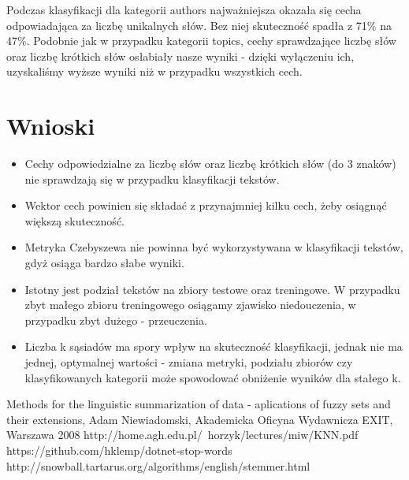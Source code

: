 \documentclass{classrep}
\begin{document}
Podczas klasyfikacji dla kategorii authors najważniejsza okazała się cecha odpowiadająca za liczbę unikalnych słów. Bez niej skuteczność spadła z 71\% na 47\%. Podobnie jak w przypadku kategorii topics, cechy sprawdzające liczbę słów oraz liczbę krótkich słów osłabiały nasze wyniki - dzięki wyłączeniu ich, uzyskaliśmy wyższe wyniki niż w przypadku wszystkich cech. 

	
\section{Wnioski}
\begin{itemize}
	\item Cechy odpowiedzialne za liczbę słów oraz liczbę krótkich słów (do 3 znaków)  nie sprawdzają się w przypadku klasyfikacji tekstów.
	\item Wektor cech powinien się składać z przynajmniej kilku cech, żeby osiągnąć większą skuteczność.
	\item Metryka Czebyszewa nie powinna być wykorzystywana w klasyfikacji tekstów, gdyż osiąga bardzo słabe wyniki.
	\item Istotny jest podział tekstów na zbiory testowe oraz treningowe. W przypadku zbyt małego zbioru treningowego osiągamy zjawisko niedouczenia, w przypadku zbyt dużego - przeuczenia.
	\item Liczba k sąsiadów ma spory wpływ na skuteczność klasyfikacji, jednak nie ma jednej, optymalnej wartości - zmiana metryki, podziału zbiorów czy klasyfikowanych kategorii może spowodować obniżenie wyników dla stałego k.
\end{itemize}

	

\begin{thebibliography}{}
Methods for the linguistic summarization of data - aplications of fuzzy sets and their extensions, Adam Niewiadomski, Akademicka Oficyna Wydawnicza EXIT, Warszawa 2008
http://home.agh.edu.pl/~horzyk/lectures/miw/KNN.pdf
https://github.com/hklemp/dotnet-stop-words
http://snowball.tartarus.org/algorithms/english/stemmer.html
\end{thebibliography}
\end{document}
